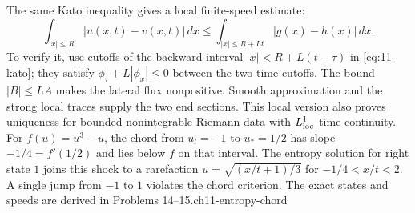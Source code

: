 The same Kato inequality gives a local finite-speed estimate:
\[
 \int_{|x|\le R}|u(x,t)-v(x,t)|\,dx
 \le\int_{|x|\le R+Lt}|g(x)-h(x)|\,dx.
\]
To verify it, use cutoffs of the backward interval
$|x|<R+L(t-\tau)$ in \eqref{eq:11-kato}; they satisfy
$\phi_\tau+L|\phi_x|\le0$ between the two time cutoffs.
The bound $|B|\le LA$ makes the lateral flux nonpositive.
Smooth approximation and the strong local traces supply the two
end sections. This local version also proves uniqueness for bounded
nonintegrable Riemann data with $L^1_{\rm loc}$ time continuity.
{For $f(u)=u^3-u$, the chord from $u_l=-1$ to $u_*=1/2$ has slope
$-1/4=f'(1/2)$ and lies below $f$ on that interval. The entropy
solution for right state $1$ joins this shock to a rarefaction
$u=\sqrt{(x/t+1)/3}$ for $-1/4<x/t<2$.
A single jump from $-1$ to $1$ violates the chord criterion.
The exact states and speeds are derived in Problems 14--15.}{ch11-entropy-chord}
